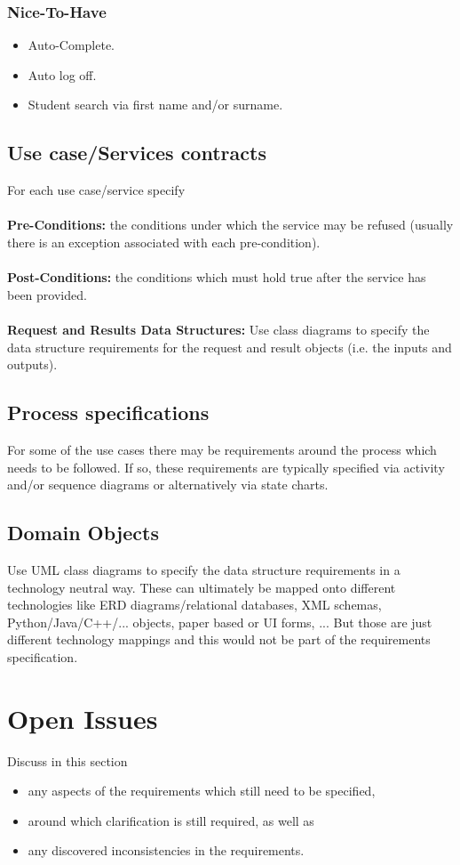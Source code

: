\documentclass[11pt,a4paper]{article}
\begin{document}
\subsubsection{Nice-To-Have} 
\begin{itemize}
\item Auto-Complete.
\item Auto log off.
\item Student search via first name and/or surname.
\end{itemize}

\subsection{Use case/Services contracts}
For each use case/service specify
\\\\
\textbf{Pre-Conditions: }the conditions under which the service may be refused (usually there is an exception associated with each pre-condition).
\\\\
\textbf{Post-Conditions: }the conditions which must hold true after the service has been provided.
\\\\
\textbf{Request and Results Data Structures: }Use class diagrams to specify the data structure requirements for the request and result objects (i.e. the inputs and outputs).
\subsection{Process specifications}
For some of the use cases there may be requirements around the process which needs to be followed. If so, these requirements are typically specified via activity and/or sequence diagrams or
alternatively via state charts.
\subsection{Domain Objects}
Use UML class diagrams to specify the data structure requirements in a technology neutral way. These can ultimately be mapped onto different technologies like ERD diagrams/relational databases, XML schemas, Python/Java/C++/... objects, paper based or UI forms, ... But those are just different technology mappings and this would not be part of the requirements specification.
\section{Open Issues}
Discuss in this section
\begin{itemize}
	\item any aspects of the requirements which still need to be specified,
	\item around which clarification is still required, as well as
	\item any discovered inconsistencies in the requirements.
\end{itemize}
\end{document}
